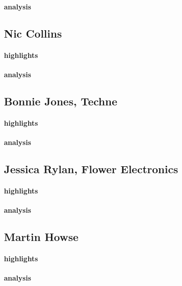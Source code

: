 \paragraph{analysis}

\subsection{Nic Collins}
\paragraph{highlights}
\paragraph{analysis}

\subsection{Bonnie Jones, Techne}
\paragraph{highlights}
\paragraph{analysis}

\subsection{Jessica Rylan, Flower Electronics}
\paragraph{highlights}
\paragraph{analysis}

\subsection{Martin Howse}
\paragraph{highlights}
\paragraph{analysis}

